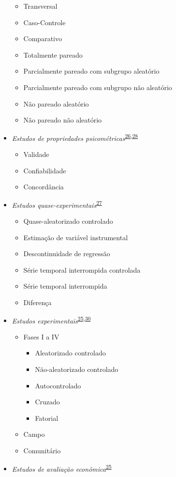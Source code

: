\documentclass[
  a4paper,
]{book}
\begin{document}
\begin{itemize}
  \begin{itemize}
  \item
    Transversal
  \item
    Caso-Controle
  \item
    Comparativo
  \item
    Totalmente pareado
  \item
    Parcialmente pareado com subgrupo aleatório
  \item
    Parcialmente pareado com subgrupo não aleatório
  \item
    Não pareado aleatório
  \item
    Não pareado não aleatório
  \end{itemize}
\item
  \emph{Estudos de propriedades psicométricas}\textsuperscript{\protect\hyperlink{ref-Souza2017}{26},\protect\hyperlink{ref-echevarruxeda-guanilo2019}{28}}

  \begin{itemize}
  \item
    Validade
  \item
    Confiabilidade
  \item
    Concordância
  \end{itemize}
\item
  \emph{Estudos quase-experimentais}\textsuperscript{\protect\hyperlink{ref-reeves2017}{27}}

  \begin{itemize}
  \item
    Quase-aleatorizado controlado
  \item
    Estimação de variável instrumental
  \item
    Descontinuidade de regressão
  \item
    Série temporal interrompida controlada
  \item
    Série temporal interrompida
  \item
    Diferença
  \end{itemize}
\item
  \emph{Estudos experimentais}\textsuperscript{\protect\hyperlink{ref-Suxfct2014}{25},\protect\hyperlink{ref-Chidambaram2019}{30}}

  \begin{itemize}
  \item
    Fases I a IV

    \begin{itemize}
    \item
      Aleatorizado controlado
    \item
      Não-aleatorizado controlado
    \item
      Autocontrolado
    \item
      Cruzado
    \item
      Fatorial
    \end{itemize}
  \item
    Campo
  \item
    Comunitário
  \end{itemize}
\item
  \emph{Estudos de avaliação econômica}\textsuperscript{\protect\hyperlink{ref-Suxfct2014}{25}}


\end{itemize}
\end{document}
